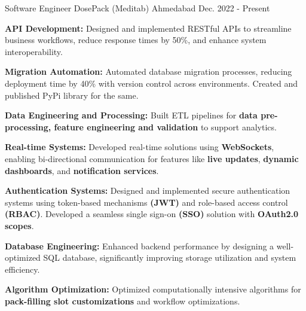 
\begin{cventries}

  \cventry
    {Software Engineer} %
    {DosePack (Meditab)} %
    {Ahmedabad} %
    {Dec. 2022 - Present} %
    {
      \begin{cvitems} %
        \item \textbf{API Development:} Designed and implemented RESTful APIs to streamline business workflows, reduce response times by 50\%, and enhance system interoperability.
        \vspace{0.4em}
        \item \textbf{Migration Automation:} Automated database migration processes, reducing deployment time by 40\% with version control across environments. Created and published PyPi library for the same.
        \item \textbf{Data Engineering and Processing:} Built ETL pipelines for \textbf{ data pre-processing, feature engineering and validation} to support analytics.
        \vspace{0.4em}
        \item \textbf{Real-time Systems:} Developed real-time solutions using \textbf{WebSockets}, enabling bi-directional communication for features like \textbf{live updates}, \textbf{dynamic dashboards}, and \textbf{notification services}.
        \vspace{0.4em}
        \item \textbf{Authentication Systems:} Designed and implemented secure authentication systems using token-based mechanisms \textbf{(JWT)} and role-based access control \textbf{(RBAC)}. Developed a seamless single sign-on \textbf{(SSO)} solution with \textbf{OAuth2.0 scopes}.
        \vspace{0.4em}
        \item \textbf{Database Engineering:} Enhanced backend performance by designing a well-optimized SQL database, significantly improving storage utilization and system efficiency.
        \vspace{0.4em}
        \item \textbf{Algorithm Optimization:} Optimized computationally intensive algorithms for \textbf{pack-filling slot customizations} and workflow optimizations.
      \end{cvitems}
    }


\end{cventries}
